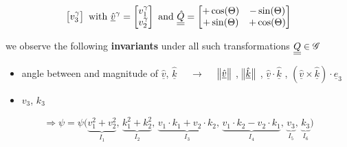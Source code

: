 \begin{frame}
\begin{displaymath}
\begin{bmatrix}
      v_3^{\gamma}
    \end{bmatrix}   
    \text{ with }
    \underline{\hat{v}}^{\gamma} =
    \begin{bmatrix}
      v_1^{\gamma} \\ v_2^{\gamma}
    \end{bmatrix}
    \text{ and }
    \underline{\underline{\hat{Q}}} =
    \begin{bmatrix}
      +\cos(\Theta) & -\sin(\Theta) \\
      +\sin(\Theta) & +\cos(\Theta)
    \end{bmatrix}
  \end{displaymath}
  
  \vspace{0.4em}
  we observe the following \textbf{invariants} under all such transformations $\underline{\underline{Q}} \in \mathscr{G}$
  \begin{itemize}
    \item angle between and magnitude of $\underline{\hat{v}}$, $\underline{\hat{k}}$
      $\quad \rightarrow \quad$
      $\enVert[1]{\underline{\hat{v}}}$ , $\enVert[1]{\underline{\hat{k}}}$ , $\underline{\hat{v}} \cdot \underline{\hat{k}}$ , $\left( \underline{\hat{v}} \times \underline{\hat{k}} \right) \cdot \underline{e}_3$
    \item $v_3$, $k_3$
  \end{itemize}
  
  \vspace{-1em}
  \begin{displaymath}
    \Rightarrow
    \psi = \psi \bigl(
      \underbrace{v_1^2 + v_2^2}_{I_1} , \, \underbrace{k_1^2 + k_2^2}_{I_2} , \, \underbrace{v_1 \cdot k_1 + v_2 \cdot k_2}_{I_3} , \, \underbrace{v_1 \cdot k_2 - v_2 \cdot k_1}_{I_4} , \, \underbrace{v_3}_{I_5} , \, \underbrace{k_3}_{I_6}
    \bigr)
  \end{displaymath}
\end{frame}

